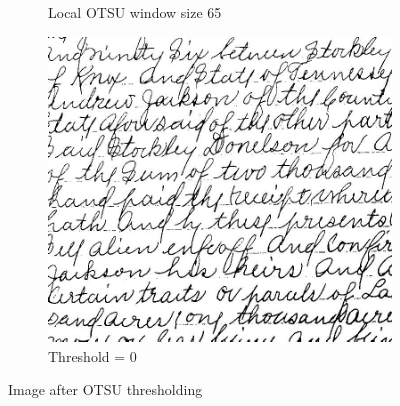 \documentclass[UTF8]{ctexart}
\begin{document}
\begin{figure}[htbp]
\begin{subfigure}{0.3\textwidth}
        \caption{Local OTSU window size 65}
    \end{subfigure}%
    \hfill
    \begin{subfigure}{0.3\textwidth}
        \centering
        \includegraphics[width=\linewidth]{thresh0.jpg}
        \caption{Threshold = 0}
    \end{subfigure}

    \caption{Image after OTSU thresholding}
\end{figure}
\end{document}
